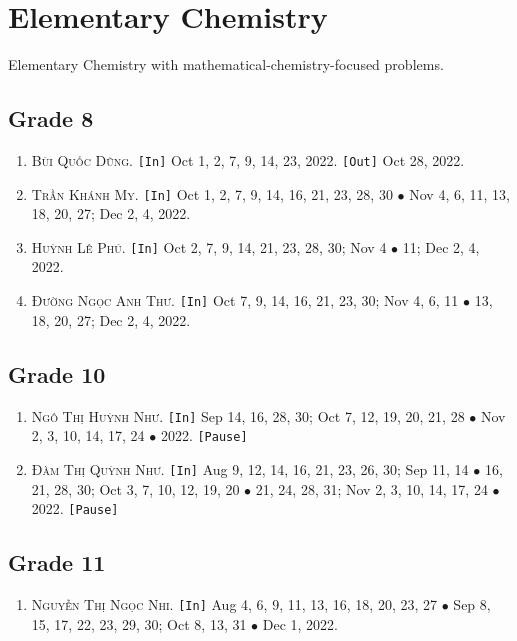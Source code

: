 \documentclass{article}
\numberwithin{equation}{section}
\begin{document}

\section{Elementary Chemistry}
Elementary Chemistry with mathematical-chemistry-focused problems.

\subsection{Grade 8}
\begin{enumerate}
	\item \textsc{Bùi Quốc Dũng.} \texttt{[In]} Oct 1, 2, 7, 9, 14, 23, 2022. \texttt{[Out]} Oct 28, 2022.
	\item \textsc{Trần Khánh My.} \texttt{[In]} Oct 1, 2, 7, 9, 14, 16, 21, 23, 28, 30 $\bullet$ Nov 4, 6, 11, 13, 18, 20, 27; Dec 2, 4, 2022.
	\item \textsc{Huỳnh Lê Phú.} \texttt{[In]} Oct 2, 7, 9, 14, 21, 23, 28, 30; Nov 4 $\bullet$ 11; Dec 2, 4, 2022.
	\item \textsc{Đường Ngọc Anh Thư.} \texttt{[In]} Oct 7, 9, 14, 16, 21, 23, 30; Nov 4, 6, 11 $\bullet$ 13, 18, 20, 27; Dec 2, 4, 2022.
\end{enumerate}

\subsection{Grade 10}
\begin{enumerate}
	\item \textsc{Ngô Thị Huỳnh Như.} \texttt{[In]} Sep 14, 16, 28, 30; Oct 7, 12, 19, 20, 21, 28 $\bullet$ Nov 2, 3, 10, 14, 17, 24 $\bullet$ 2022. \texttt{[Pause]}
	\item \textsc{Đàm Thị Quỳnh Như.} \texttt{[In]} Aug 9, 12, 14, 16, 21, 23, 26, 30; Sep 11, 14 $\bullet$ 16, 21, 28, 30; Oct 3, 7, 10, 12, 19, 20 $\bullet$ 21, 24, 28, 31; Nov 2, 3, 10, 14, 17, 24 $\bullet$ 2022. \texttt{[Pause]}
\end{enumerate}

\subsection{Grade 11}
\begin{enumerate}
	\item \textsc{Nguyễn Thị Ngọc Nhi.} \texttt{[In]} Aug 4, 6, 9, 11, 13, 16, 18, 20, 23, 27 $\bullet$ Sep 8, 15, 17, 22, 23, 29, 30; Oct 8, 13, 31 $\bullet$ Dec 1, 2022.
\end{enumerate}
\end{document}
